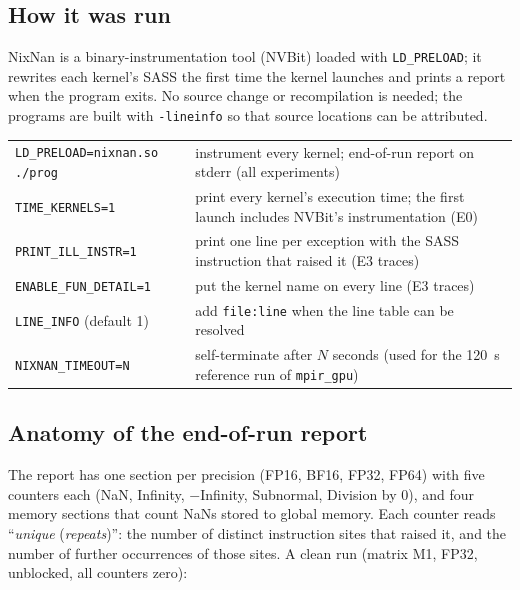 \documentclass[11pt,a4paper]{article}
\begin{document}
\subsection{How it was run}

NixNan is a binary-instrumentation tool (NVBit) loaded with \texttt{LD\_PRELOAD}; it rewrites each kernel's SASS the first time the kernel launches and prints a report when the program exits.
No source change or recompilation is needed; the programs are built with \texttt{-lineinfo} so that source locations can be attributed.

\begin{center}\small
\begin{tabular}{p{4.6cm}p{9.2cm}}
\toprule
\texttt{LD\_PRELOAD=nixnan.so ./prog} & instrument every kernel; end-of-run report on stderr (all experiments)\\
\texttt{TIME\_KERNELS=1} & print every kernel's execution time; the first launch includes NVBit's instrumentation (E0)\\
\texttt{PRINT\_ILL\_INSTR=1} & print one line per exception with the SASS instruction that raised it (E3 traces)\\
\texttt{ENABLE\_FUN\_DETAIL=1} & put the kernel name on every line (E3 traces)\\
\texttt{LINE\_INFO} (default 1) & add \texttt{file:line} when the line table can be resolved\\
\texttt{NIXNAN\_TIMEOUT=N} & self-terminate after $N$ seconds (used for the 120~s reference run of \texttt{mpir\_gpu})\\
\bottomrule
\end{tabular}
\end{center}

\subsection{Anatomy of the end-of-run report}

The report has one section per precision (FP16, BF16, FP32, FP64) with five counters each (NaN, Infinity, $-$Infinity, Subnormal, Division by 0), and four memory sections that count
NaNs stored to global memory. Each counter reads ``\emph{unique} (\emph{repeats})'': the number of distinct instruction sites that raised it, and the number of further occurrences of
those sites. A clean run (matrix M1, FP32, unblocked, all counters zero):


\end{document}
